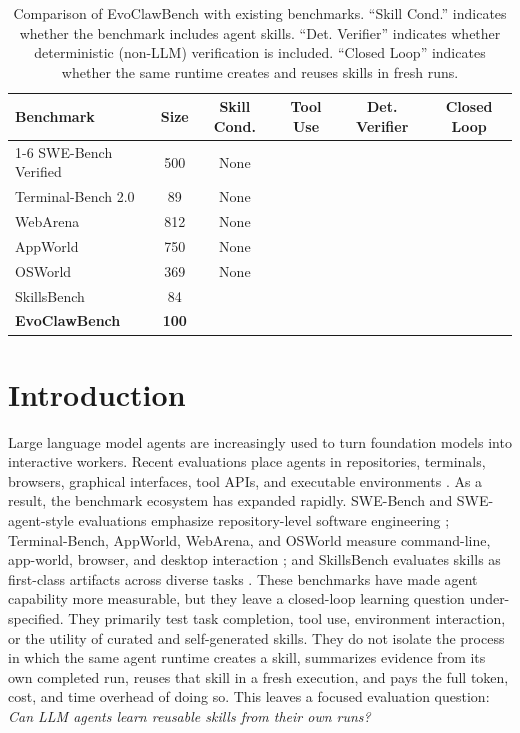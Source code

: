 \documentclass[11pt]{article}
\newcommand{\ours}{EvoClawBench}
\newcommand{\yesmark}{\textcolor{yesgreen}{\ding{51}}}
\newcommand{\nomark}{\textcolor{nored}{\ding{55}}}
\newcommand{\partialmark}{\textcolor{partialamber}{\makebox[1em][c]{\ooalign{\hfil\ding{51}\hfil\cr\hfil\ding{55}\hfil\cr}}}}
\begin{document}
\begin{table}[!t]
\centering
\caption{Comparison of \ours{} with existing benchmarks. ``Skill Cond.'' indicates whether the benchmark includes agent skills. ``Det. Verifier'' indicates whether deterministic (non-LLM) verification is included. ``Closed Loop'' indicates whether the same runtime creates and reuses skills in fresh runs.}
\label{tab:comparison}
\small
\begin{tabular}{lccccc}
\toprule
\textbf{Benchmark} & \textbf{Size} & \textbf{Skill Cond.} & \textbf{Tool Use} & \textbf{Det. Verifier} & \textbf{Closed Loop} \\
\cmidrule(lr){1-6}
SWE-Bench Verified & 500 & None & \yesmark & \yesmark & \nomark \\
Terminal-Bench 2.0 & 89 & None & \yesmark & \yesmark & \nomark \\
WebArena & 812 & None & \yesmark & \partialmark & \nomark \\
AppWorld & 750 & None & \yesmark & \yesmark & \nomark \\
OSWorld & 369 & None & \yesmark & \partialmark & \nomark \\
SkillsBench & 84 & \yesmark & \yesmark & \yesmark & \nomark \\
\midrule
\textbf{\ours{}} & \textbf{100} & \textbf{\yesmark} & \textbf{\yesmark} & \textbf{\yesmark} & \textbf{\yesmark} \\
\bottomrule
\end{tabular}
\end{table}

\section{Introduction}
\label{sec:intro}

Large language model agents are increasingly used to turn foundation models into interactive workers.
Recent evaluations place agents in repositories, terminals, browsers, graphical interfaces, tool APIs, and executable environments \citep{fourney2024magenticone,wang2025openhands,xu2025agentcompany,agashe2025agents2,cursor2026composer2}.
As a result, the benchmark ecosystem has expanded rapidly.
SWE-Bench and SWE-agent-style evaluations emphasize repository-level software engineering \citep{jimenez2024swebench,yang2024sweagent}; Terminal-Bench, AppWorld, WebArena, and OSWorld measure command-line, app-world, browser, and desktop interaction \citep{zhou2023webarena,trivedi2024appworld,xie2024osworld,merrill2026terminalbench}; and SkillsBench evaluates skills as first-class artifacts across diverse tasks \citep{li2026skillsbench}. These benchmarks have made agent capability more measurable, but they leave a closed-loop learning question under-specified.
They primarily test task completion, tool use, environment interaction, or the utility of curated and self-generated skills.
They do not isolate the process in which the same agent runtime creates a skill, summarizes evidence from its own completed run, reuses that skill in a fresh execution, and pays the full token, cost, and time overhead of doing so.
This leaves a focused evaluation question: \emph{Can LLM agents learn reusable skills from their own runs?}
\end{document}
